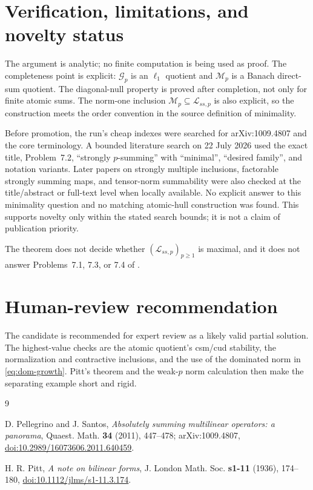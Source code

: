 \documentclass[11pt]{amsart}
\newcommand{\Lcal}{\mathcal L}
\newcommand{\Gcal}{\mathcal G}
\newcommand{\Mcal}{\mathcal M}
\begin{document}
\section*{Verification, limitations, and novelty status}

The argument is analytic; no finite computation is being used as proof.  The
completeness point is explicit: $\Gcal_p$ is an $\ell_1$ quotient and
$\Mcal_p$ is a Banach direct-sum quotient.  The diagonal-null property is
proved after completion, not only for finite atomic sums.  The norm-one
inclusion $\Mcal_p\subseteq\Lcal_{ss,p}$ is also explicit, so the construction
meets the order convention in the source definition of minimality.

Before promotion, the run's cheap indexes were searched for arXiv:1009.4807
and the core terminology.  A bounded literature search on 22 July 2026 used
the exact title, Problem~7.2, ``strongly $p$-summing'' with ``minimal'',
``desired family'', and notation variants.  Later papers on strongly multiple
inclusions, factorable strongly summing maps, and tensor-norm summability were
also checked at the title/abstract or full-text level when locally available.
No explicit answer to this minimality question and no matching atomic-hull
construction was found.  This supports novelty only within the stated search
bounds; it is not a claim of publication priority.

The theorem does not decide whether $(\Lcal_{ss,p})_{p\geq1}$ is maximal, and
it does not answer Problems~7.1, 7.3, or 7.4 of \cite{PS}.

\section*{Human-review recommendation}

The candidate is recommended for expert review as a likely valid partial
solution.  The highest-value checks are the atomic quotient's csm/cud
stability, the normalization and contractive inclusions, and the use of the
dominated norm in \eqref{eq:dom-growth}.  Pitt's theorem and the weak-$p$ norm
calculation then make the separating example short and rigid.

\begin{thebibliography}{9}

D. Pellegrino and J. Santos,
\emph{Absolutely summing multilinear operators: a panorama},
Quaest. Math. \textbf{34} (2011), 447--478;
arXiv:1009.4807,
\href{https://doi.org/10.2989/16073606.2011.640459}{doi:10.2989/16073606.2011.640459}.

H. R. Pitt,
\emph{A note on bilinear forms},
J. London Math. Soc. \textbf{s1-11} (1936), 174--180,
\href{https://doi.org/10.1112/jlms/s1-11.3.174}{doi:10.1112/jlms/s1-11.3.174}.

\end{thebibliography}
\end{document}
